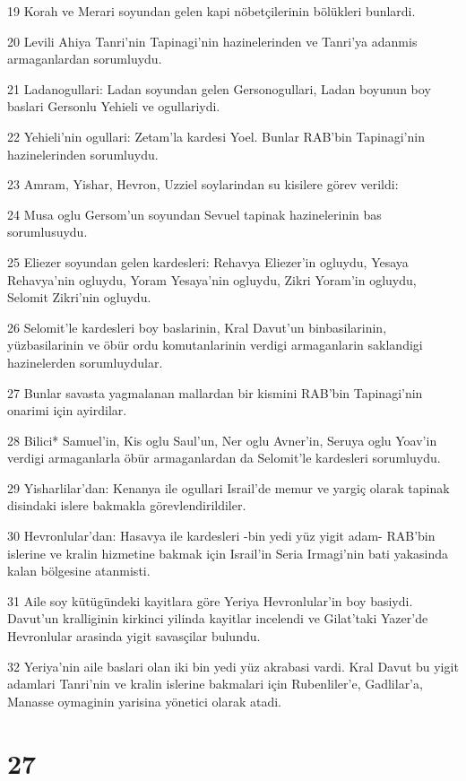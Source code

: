 \par 19 Korah ve Merari soyundan gelen kapi nöbetçilerinin bölükleri bunlardi.
\par 20 Levili Ahiya Tanri'nin Tapinagi'nin hazinelerinden ve Tanri'ya adanmis armaganlardan sorumluydu.
\par 21 Ladanogullari: Ladan soyundan gelen Gersonogullari, Ladan boyunun boy baslari Gersonlu Yehieli ve ogullariydi.
\par 22 Yehieli'nin ogullari: Zetam'la kardesi Yoel. Bunlar RAB'bin Tapinagi'nin hazinelerinden sorumluydu.
\par 23 Amram, Yishar, Hevron, Uzziel soylarindan su kisilere görev verildi:
\par 24 Musa oglu Gersom'un soyundan Sevuel tapinak hazinelerinin bas sorumlusuydu.
\par 25 Eliezer soyundan gelen kardesleri: Rehavya Eliezer'in ogluydu, Yesaya Rehavya'nin ogluydu, Yoram Yesaya'nin ogluydu, Zikri Yoram'in ogluydu, Selomit Zikri'nin ogluydu.
\par 26 Selomit'le kardesleri boy baslarinin, Kral Davut'un binbasilarinin, yüzbasilarinin ve öbür ordu komutanlarinin verdigi armaganlarin saklandigi hazinelerden sorumluydular.
\par 27 Bunlar savasta yagmalanan mallardan bir kismini RAB'bin Tapinagi'nin onarimi için ayirdilar.
\par 28 Bilici* Samuel'in, Kis oglu Saul'un, Ner oglu Avner'in, Seruya oglu Yoav'in verdigi armaganlarla öbür armaganlardan da Selomit'le kardesleri sorumluydu.
\par 29 Yisharlilar'dan: Kenanya ile ogullari Israil'de memur ve yargiç olarak tapinak disindaki islere bakmakla görevlendirildiler.
\par 30 Hevronlular'dan: Hasavya ile kardesleri -bin yedi yüz yigit adam- RAB'bin islerine ve kralin hizmetine bakmak için Israil'in Seria Irmagi'nin bati yakasinda kalan bölgesine atanmisti.
\par 31 Aile soy kütügündeki kayitlara göre Yeriya Hevronlular'in boy basiydi. Davut'un kralliginin kirkinci yilinda kayitlar incelendi ve Gilat'taki Yazer'de Hevronlular arasinda yigit savasçilar bulundu.
\par 32 Yeriya'nin aile baslari olan iki bin yedi yüz akrabasi vardi. Kral Davut bu yigit adamlari Tanri'nin ve kralin islerine bakmalari için Rubenliler'e, Gadlilar'a, Manasse oymaginin yarisina yönetici olarak atadi.

\chapter{27}

